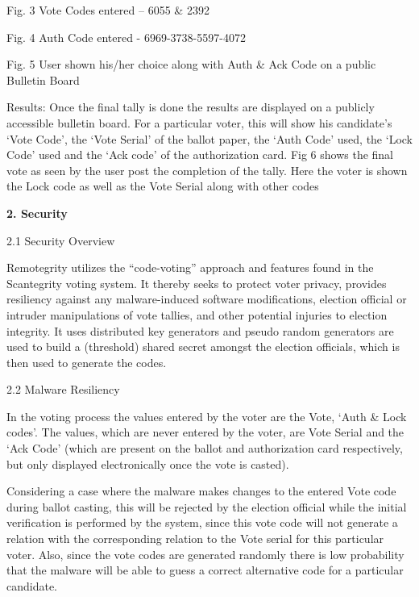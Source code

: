 
Fig. 3 Vote Codes entered -- 6055 \& 2392


\bigskip


Fig. 4 Auth Code entered - 6969-3738-5597-4072


\bigskip


\bigskip


Fig. 5 User shown his/her choice along with Auth \& Ack Code on a public Bulletin Board

Results: Once the final tally is done the results are displayed on a publicly accessible bulletin board. For a particular voter, this will show his candidate's `Vote Code', the `Vote Serial' of the ballot paper, the `Auth Code' used, the `Lock Code' used and the `Ack code' of the authorization card. Fig 6 shows the final vote as seen by the user post the completion of the tally. Here the voter is shown the Lock code as well as the Vote Serial along with other codes

\textbf{2. Security}

2.1 Security Overview

Remotegrity utilizes the ``code-voting'' approach and features found in the Scantegrity voting system. It thereby seeks to protect voter privacy, provides resiliency against any malware-induced software modifications, election official or intruder manipulations of vote tallies, and other potential injuries to election integrity. It uses distributed key generators and pseudo random generators are used to build a (threshold) shared secret amongst the election officials, which is then used to generate the codes.

2.2 Malware Resiliency

In the voting process the values entered by the voter are the Vote, `Auth \& Lock codes'. The values, which are never entered by the voter, are Vote Serial and the `Ack Code' (which are present on the ballot and authorization card respectively, but only displayed electronically once the vote is casted).

Considering a case where the malware makes changes to the entered Vote code during ballot casting, this will be rejected by the election official while the initial verification is performed by the system, since this vote code will not generate a relation with the corresponding relation to the Vote serial for this particular voter. Also, since the vote codes are generated randomly there is low probability that the malware will be able to guess a correct alternative code for a particular candidate.


